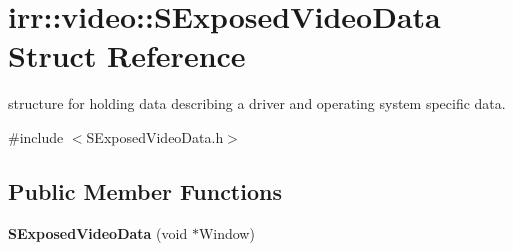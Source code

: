 \hypertarget{structirr_1_1video_1_1SExposedVideoData}{}\section{irr\+:\+:video\+:\+:S\+Exposed\+Video\+Data Struct Reference}
\label{structirr_1_1video_1_1SExposedVideoData}


structure for holding data describing a driver and operating system specific data.  




{\ttfamily \#include $<$S\+Exposed\+Video\+Data.\+h$>$}

\subsection*{Public Member Functions}
\begin{DoxyCompactItemize}
\item 
{\bfseries S\+Exposed\+Video\+Data} (void $\ast$Window)\hypertarget{structirr_1_1video_1_1SExposedVideoData_ae9ee41d892eea320bbd5dc1f76230d6b}{}\label{structirr_1_1video_1_1SExposedVideoData_ae9ee41d892eea320bbd5dc1f76230d6b}

\end{DoxyCompactItemize}
